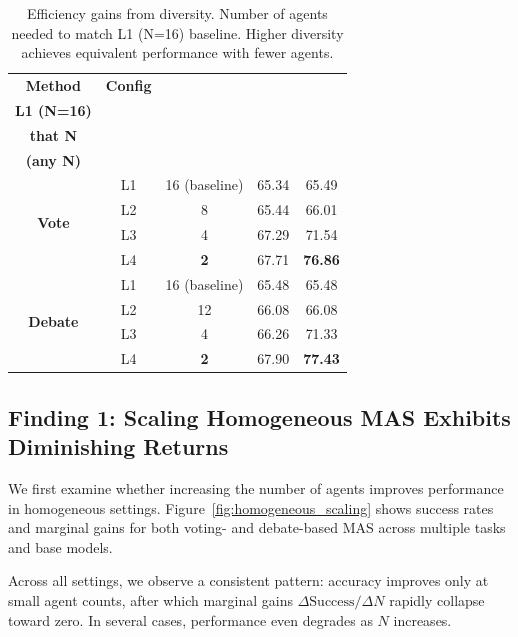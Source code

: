 \documentclass{article}
\theoremstyle{plain}
\theoremstyle{definition}
\theoremstyle{remark}
\begin{document}
\begin{table}[t]
\centering
\caption{Efficiency gains from diversity. Number of agents needed to match L1 (N=16) baseline. Higher diversity achieves equivalent performance with fewer agents.} 
\vspace{-0.2cm}
\label{tab:efficiency}
\scriptsize
\setlength{\tabcolsep}{5pt}
\begin{tabular}{c|c|c|c|c}
\toprule
\textbf{Method} & \textbf{Config} & \makecell{\textbf{Agents to Match}\\\textbf{L1 (N=16)}} & \makecell{\textbf{Accuracy at}\\\textbf{that N}} & \makecell{\textbf{Peak Accuracy}\\\textbf{(any N)}} \\
\midrule
\multirow{4}{*}{\textbf{Vote}}
& L1 & 16 (baseline) & 65.34 & 65.49 \\
& L2 & 8  & 65.44 & 66.01 \\
& L3 & 4  & 67.29 & 71.54 \\
\rowcolor{green!10}
& L4 & \textbf{2} & 67.71 & \textbf{76.86} \\
\midrule
\multirow{4}{*}{\textbf{Debate}}
& L1 & 16 (baseline) & 65.48 & 65.48 \\
& L2 & 12 & 66.08 & 66.08 \\
& L3 & 4  & 66.26 & 71.33 \\
\rowcolor{green!10}
& L4 & \textbf{2} & 67.90 & \textbf{77.43} \\
\bottomrule
\end{tabular}
\vspace{-0.5cm}
\end{table}


\subsection{Finding 1: Scaling Homogeneous MAS Exhibits Diminishing Returns}
We first examine whether increasing the number of agents improves performance in homogeneous settings.
Figure~\ref{fig:homogeneous_scaling} shows success rates and marginal gains for both voting- and debate-based MAS across multiple tasks and base models.

Across all settings, we observe a consistent pattern:
accuracy improves only at small agent counts, after which marginal gains $\Delta\text{Success}/\Delta N$ rapidly collapse toward zero.
In several cases, performance even degrades as $N$ increases.
\end{document}
